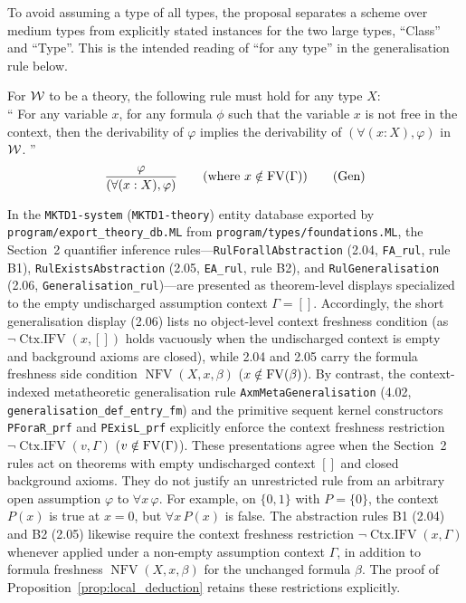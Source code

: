 \begin{note}
To avoid assuming a type of all types, the proposal separates a scheme over
medium types from explicitly stated instances for the two large types,
``Class'' and ``Type''. This is the intended reading of ``for any type''
in the generalisation rule below.
\end{note}
\begin{definition}[generalisation rule(s)]%
For ${\mathcal{W}}$ to be a theory, the following rule must hold for any type $X$:\\
``
For any variable $x$, for any formula $\phi$ such that the variable $x$ is not free in the context, then
the derivability of $\varphi$  implies the derivability of $(\forall (x:X),\varphi)$ in ${\mathcal{W}}$.
''
\[
\frac{
\varphi
}{
(\forall (x:X),\varphi)
}
\quad\quad(\mbox{where }x\notin\FV(\Gamma))
\labeltag{Gen}
\]
\end{definition}
\begin{note}
In the \texttt{MKTD1-system} (\texttt{MKTD1-theory}) entity database exported by
\texttt{program/export\_theory\_db.ML} from \texttt{program/types/foundations.ML},
the Section~2 quantifier inference rules---\texttt{RulForallAbstraction} (2.04,
\texttt{FA\_rul}, rule B1), \texttt{RulExistsAbstraction} (2.05, \texttt{EA\_rul},
rule B2), and \texttt{RulGeneralisation} (2.06, \texttt{Generalisation\_rul})---are
presented as theorem-level displays specialized to the empty undischarged
assumption context $\Gamma = []$. Accordingly, the short generalisation display
(2.06) lists no object-level context freshness condition (as $\neg\operatorname{Ctx.IFV}(x,[])$
holds vacuously when the undischarged context is empty and background axioms are
closed), while 2.04 and 2.05 carry the formula freshness side condition
$\operatorname{NFV}(X, x, \beta)$ ($x \notin \mathrm{FV}(\beta)$). By contrast, the
context-indexed metatheoretic generalisation rule \texttt{AxmMetaGeneralisation}
(4.02, \texttt{generalisation\_def\_entry\_fm}) and the primitive sequent kernel
constructors \texttt{PForaR\_prf} and \texttt{PExisL\_prf} explicitly enforce the
context freshness restriction $\neg\operatorname{Ctx.IFV}(v, \Gamma)$ ($v \notin \mathrm{FV}(\Gamma)$).
These presentations agree when the Section~2 rules act on theorems with empty
undischarged context $[]$ and closed background axioms. They do not justify an
unrestricted rule from an arbitrary open assumption $\varphi$ to $\forall x\,\varphi$.
For example, on $\{0,1\}$ with $P=\{0\}$, the context $P(x)$ is true
at $x=0$, but $\forall x\,P(x)$ is false. The abstraction rules B1 (2.04) and
B2 (2.05) likewise require the context freshness restriction
$\neg\operatorname{Ctx.IFV}(x, \Gamma)$ whenever applied under a non-empty
assumption context $\Gamma$, in addition to formula freshness $\operatorname{NFV}(X, x, \beta)$
for the unchanged formula $\beta$. The proof of
Proposition~\ref{prop:local_deduction} retains these restrictions explicitly.
\end{note}

